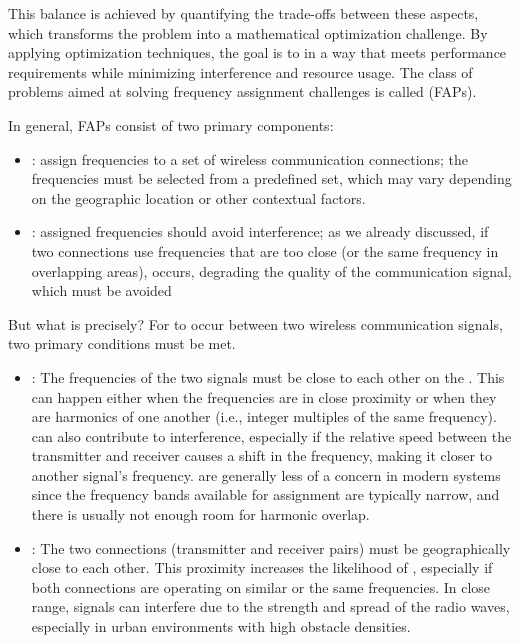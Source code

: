 \documentclass[a4paper, 12pt]{report}
\begin{document}
    This balance is achieved by quantifying the trade-offs between these aspects, which transforms the problem into a mathematical optimization challenge. By applying optimization techniques, the goal is to  in a way that meets performance requirements while minimizing interference and resource usage. The class of problems aimed at solving frequency assignment challenges is called  (FAPs).

    In general, FAPs consist of two primary components:

    \begin{itemize}
        \item {}: assign frequencies to a set of wireless communication connections; the frequencies must be selected from a predefined set, which may vary depending on the geographic location or other contextual factors.
        \item {}: assigned frequencies should avoid interference; as we already discussed, if two connections use frequencies that are too close (or the same frequency in overlapping areas),  occurs, degrading the quality of the communication signal, which must be avoided
    \end{itemize}

    But what is  precisely? For  to occur between two wireless communication signals, two primary conditions must be met.

    \begin{itemize}
        \item {}: The frequencies of the two signals must be close to each other on the . This can happen either when the frequencies are in close proximity or when they are harmonics of one another (i.e., integer multiples of the same frequency).  can also contribute to interference, especially if the relative speed between the transmitter and receiver causes a shift in the frequency, making it closer to another signal's frequency.  are generally less of a concern in modern systems since the frequency bands available for assignment are typically narrow, and there is usually not enough room for harmonic overlap.
        \item {}: The two connections (transmitter and receiver pairs) must be geographically close to each other. This proximity increases the likelihood of , especially if both connections are operating on similar or the same frequencies. In close range, signals can interfere due to the strength and spread of the radio waves, especially in urban environments with high obstacle densities.
    \end{itemize}
\end{document}
